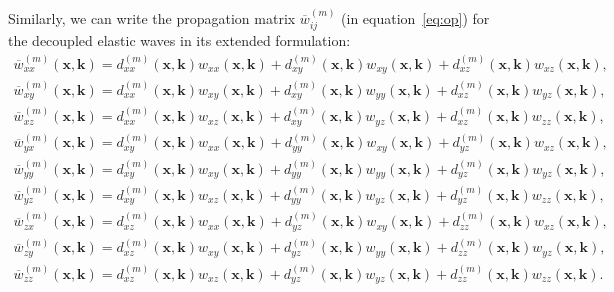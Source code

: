 Similarly, we can write the propagation matrix $\overline{w}_{ij}^{(m)}$ (in equation~\ref{eq:op}) for the decoupled elastic waves
in its extended formulation:
\begin{equation}
\begin{array}{lcl}
\label{eq:com}
\overline{w}_{xx}^{(m)}(\mathbf{x},\mathbf{k}) =
d_{xx}^{(m)}(\mathbf{x},\mathbf{k})w_{xx}(\mathbf{x},\mathbf{k})+d_{xy}^{(m)}(\mathbf{x},\mathbf{k})w_{xy}(\mathbf{x},\mathbf{k})+d_{xz}^{(m)}(\mathbf{x},\mathbf{k})w_{xz}(\mathbf{x},\mathbf{k}), \\
\overline{w}_{xy}^{(m)}(\mathbf{x},\mathbf{k}) =
d_{xx}^{(m)}(\mathbf{x},\mathbf{k})w_{xy}(\mathbf{x},\mathbf{k})+d_{xy}^{(m)}(\mathbf{x},\mathbf{k})w_{yy}(\mathbf{x},\mathbf{k})+d_{xz}^{(m)}(\mathbf{x},\mathbf{k})w_{yz}(\mathbf{x},\mathbf{k}), \\
\overline{w}_{xz}^{(m)}(\mathbf{x},\mathbf{k}) =
d_{xx}^{(m)}(\mathbf{x},\mathbf{k})w_{xz}(\mathbf{x},\mathbf{k})+d_{xy}^{(m)}(\mathbf{x},\mathbf{k})w_{yz}(\mathbf{x},\mathbf{k})+d_{xz}^{(m)}(\mathbf{x},\mathbf{k})w_{zz}(\mathbf{x},\mathbf{k}), \\
\overline{w}_{yx}^{(m)}(\mathbf{x},\mathbf{k}) =
d_{xy}^{(m)}(\mathbf{x},\mathbf{k})w_{xx}(\mathbf{x},\mathbf{k})+d_{yy}^{(m)}(\mathbf{x},\mathbf{k})w_{xy}(\mathbf{x},\mathbf{k})+d_{yz}^{(m)}(\mathbf{x},\mathbf{k})w_{xz}(\mathbf{x},\mathbf{k}), \\
\overline{w}_{yy}^{(m)}(\mathbf{x},\mathbf{k}) =
d_{xy}^{(m)}(\mathbf{x},\mathbf{k})w_{xy}(\mathbf{x},\mathbf{k})+d_{yy}^{(m)}(\mathbf{x},\mathbf{k})w_{yy}(\mathbf{x},\mathbf{k})+d_{yz}^{(m)}(\mathbf{x},\mathbf{k})w_{yz}(\mathbf{x},\mathbf{k}), \\
\overline{w}_{yz}^{(m)}(\mathbf{x},\mathbf{k}) =
d_{xy}^{(m)}(\mathbf{x},\mathbf{k})w_{xz}(\mathbf{x},\mathbf{k})+d_{yy}^{(m)}(\mathbf{x},\mathbf{k})w_{yz}(\mathbf{x},\mathbf{k})+d_{yz}^{(m)}(\mathbf{x},\mathbf{k})w_{zz}(\mathbf{x},\mathbf{k}), \\
\overline{w}_{zx}^{(m)}(\mathbf{x},\mathbf{k}) =
d_{xz}^{(m)}(\mathbf{x},\mathbf{k})w_{xx}(\mathbf{x},\mathbf{k})+d_{yz}^{(m)}(\mathbf{x},\mathbf{k})w_{xy}(\mathbf{x},\mathbf{k})+d_{zz}^{(m)}(\mathbf{x},\mathbf{k})w_{xz}(\mathbf{x},\mathbf{k}),
\\
\overline{w}_{zy}^{(m)}(\mathbf{x},\mathbf{k}) =
d_{xz}^{(m)}(\mathbf{x},\mathbf{k})w_{xy}(\mathbf{x},\mathbf{k})+d_{yz}^{(m)}(\mathbf{x},\mathbf{k})w_{yy}(\mathbf{x},\mathbf{k})+d_{zz}^{(m)}(\mathbf{x},\mathbf{k})w_{yz}(\mathbf{x},\mathbf{k}),
\\
\overline{w}_{zz}^{(m)}(\mathbf{x},\mathbf{k}) =
d_{xz}^{(m)}(\mathbf{x},\mathbf{k})w_{xz}(\mathbf{x},\mathbf{k})+d_{yz}^{(m)}(\mathbf{x},\mathbf{k})w_{yz}(\mathbf{x},\mathbf{k})+d_{zz}^{(m)}(\mathbf{x},\mathbf{k})w_{zz}(\mathbf{x},\mathbf{k}).
\end{array}
\end{equation}

